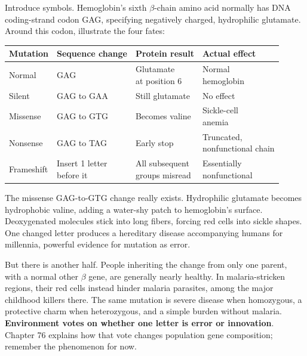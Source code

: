 Introduce symbols. Hemoglobin's sixth \(\beta\)-chain amino acid normally has DNA coding-strand codon GAG, specifying negatively charged, hydrophilic glutamate. Around this codon, illustrate the four fates:

\begin{table}[htbp]
\centering
\begin{tabular}{llll}
\toprule
Mutation & Sequence change & Protein result & Actual effect \\
\midrule
Normal & GAG & \shortstack[l]{Glutamate\\at position 6} & \shortstack[l]{Normal\\hemoglobin} \\
Silent & GAG to GAA & Still glutamate & No effect \\
Missense & GAG to GTG & Becomes valine & \shortstack[l]{Sickle-cell\\anemia} \\
Nonsense & GAG to TAG & Early stop & \shortstack[l]{Truncated,\\nonfunctional chain} \\
Frameshift & \shortstack[l]{Insert 1 letter\\before it} & \shortstack[l]{All subsequent\\groups misread} & \shortstack[l]{Essentially\\nonfunctional} \\
\bottomrule
\end{tabular}
\end{table}

The missense GAG-to-GTG change really exists. Hydrophilic glutamate becomes hydrophobic valine, adding a water-shy patch to hemoglobin's surface. Deoxygenated molecules stick into long fibers, forcing red cells into sickle shapes. One changed letter produces a hereditary disease accompanying humans for millennia, powerful evidence for mutation as error.

But there is another half. People inheriting the change from only one parent, with a normal other \(\beta\) gene, are generally nearly healthy. In malaria-stricken regions, their red cells instead hinder malaria parasites, among the major childhood killers there. The same mutation is severe disease when homozygous, a protective charm when heterozygous, and a simple burden without malaria. \textbf{Environment votes on whether one letter is error or innovation}. Chapter 76 explains how that vote changes population gene composition; remember the phenomenon for now.

